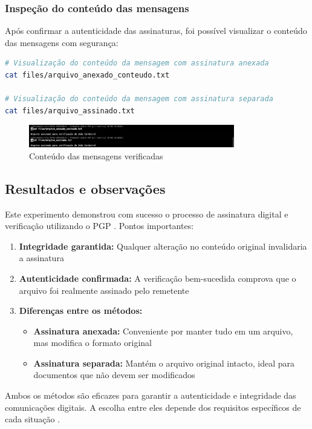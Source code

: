 \subsubsection{Inspeção do conteúdo das mensagens}

Após confirmar a autenticidade das assinaturas, foi possível visualizar o conteúdo das mensagens com segurança:

\begin{lstlisting}[language=bash]
# Visualização do conteúdo da mensagem com assinatura anexada
cat files/arquivo_anexado_conteudo.txt

# Visualização do conteúdo da mensagem com assinatura separada
cat files/arquivo_assinado.txt
\end{lstlisting}

\begin{figure}[htb]
    \centering
    \includegraphics[width=0.8\textwidth]{images/11-conteudo_mensagens_verificadas.jpg}
    \caption{Conteúdo das mensagens verificadas}
    \label{fig:conteudo-mensagens-verificadas}
\end{figure}

\subsection{Resultados e observações}

Este experimento demonstrou com sucesso o processo de assinatura digital e verificação utilizando o PGP \cite{gnupgkeysigning}. Pontos importantes:

\begin{enumerate}
    \item \textbf{Integridade garantida:} Qualquer alteração no conteúdo original invalidaria a assinatura
    \item \textbf{Autenticidade confirmada:} A verificação bem-sucedida comprova que o arquivo foi realmente assinado pelo remetente
    \item \textbf{Diferenças entre os métodos:}
    \begin{itemize}
        \item \textbf{Assinatura anexada:} Conveniente por manter tudo em um arquivo, mas modifica o formato original
        \item \textbf{Assinatura separada:} Mantém o arquivo original intacto, ideal para documentos que não devem ser modificados
    \end{itemize}
\end{enumerate}

Ambos os métodos são eficazes para garantir a autenticidade e integridade das comunicações digitais. A escolha entre eles depende dos requisitos específicos de cada situação \cite{pgpbest}.